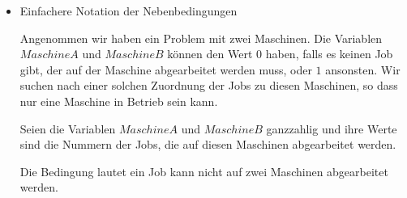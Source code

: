 \documentclass[hyperref={pdfpagelabels=false}]{beamer}
\begin{document}
\begin{frame}

	\begin{itemize}
	
	\item Einfachere Notation der Nebenbedingungen
	
	\vspace{5pt}
	{\tiny
	Angenommen wir haben ein Problem mit zwei Maschinen. Die Variablen $MaschineA$ und $MaschineB$ können den Wert $0$ haben, falls es keinen Job gibt, der auf der Maschine abgearbeitet werden muss, oder $1$ ansonsten. Wir suchen nach einer solchen Zuordnung der Jobs zu diesen Maschinen, so dass nur eine Maschine in Betrieb sein kann.\\
	}
	\vspace{5pt}
	
	\vspace{5pt}

	{\tiny
	Seien die Variablen $MaschineA$ und $MaschineB$ ganzzahlig und ihre Werte sind die Nummern der Jobs, die auf diesen Maschinen abgearbeitet werden.
	
	Die Bedingung lautet \glqq ein Job kann nicht auf zwei Maschinen abgearbeitet werden\grqq.\\}
	
	\vspace{5pt}
	

\end{itemize}
\end{frame}
\end{document}
